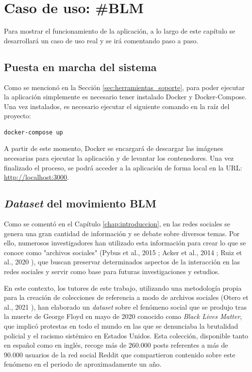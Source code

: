 \chapter{Caso de uso: \#BLM}
\label{chap:casouso}

Para mostrar el funcionamiento de la aplicación, a lo largo de este capítulo se desarrollará un caso de uso real y se irá
comentando paso a paso.

\section{Puesta en marcha del sistema}

Como se mencionó en la Sección \ref{sec:herramientas_soporte}, para poder ejecutar la aplicación simplemente es necesario tener
instalado Docker y Docker-Compose. Una vez instalados, es necesario ejecutar el siguiente comando en la raíz del
proyecto:

\bigskip
\begin{Verbatim}
docker-compose up
\end{Verbatim}

\bigskip
A partir de este momento, Docker se encargará de descargar las imágenes necesarias para ejecutar la aplicación y de levantar los
contenedores. Una vez finalizado el proceso, se podrá acceder a la aplicación de forma local en la URL: \url{http://localhost:3000}.

\section{\textit{Dataset} del movimiento BLM}

Como se comentó en el Capítulo \ref{chap:introduccion}, en las redes sociales se genera una gran cantidad de información y se debate sobre
diversos temas. Por ello, numerosos investigadores han utilizado esta información para crear lo que se conoce como "archivos sociales"
(Pybus et al., 2015 \cite{pybus2015hacking}; Acker et al., 2014 \cite{acker2014death}; Ruiz et al., 2020 \cite{ruiz2020cuentalo}),
que buscan preservar determinados aspectos de la interacción en las redes sociales y servir como base para futuras investigaciones
y estudios.

\bigskip
En este contexto, los tutores de este trabajo, utilizando una metodología propia para la creación de colecciones de referencia
a modo de archivos sociales
(Otero et al., 2021 \cite{oterorodilla2021}), han elaborado un \textit{dataset} sobre el fenómeno social
que se produjo tras la muerte de George Floyd en mayo de 2020 conocido como \textit{Black Lives Matter},
que implicó protestas en todo el mundo en las que se denunciaba la brutalidad policial y el racismo sistémico en Estados Unidos. Esta colección, 
disponible tanto en español como en inglés, recoge más de 260.000 posts referentes a más de 90.000 usuarios de la red social Reddit que compartieron contenido sobre este
fenómeno en el periodo de aproximadamente un año.

